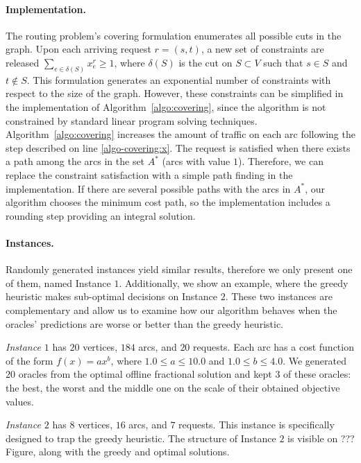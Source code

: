 \paragraph{Implementation.}
The routing problem's covering formulation enumerates all possible cuts in the graph. Upon each arriving request $r = (s,t)$, a new set of constraints are released $\sum_{e \in \delta(S)} x_{e}^{r} \ge 1$, where $\delta(S)$ is the cut on $S \subset V$ such that $s \in S$ and $t \notin S$. This formulation generates an exponential number of constraints with respect to the size of the graph. However, these constraints can be simplified in the implementation of Algorithm~\ref{algo:covering}, since the algorithm is not constrained by standard linear program solving techniques. Algorithm~\ref{algo:covering} increases the amount of traffic on each arc following the step described on line \ref{algo-covering:x}. The request is satisfied when there exists a path among the arcs in the set $A^{*}$ (arcs with value $1$). Therefore, we can replace the constraint satisfaction with a simple path finding in the implementation. If there are several possible paths with the arcs in $A^{*}$, our algorithm chooses the minimum cost path, so the implementation includes a rounding step providing an integral solution.


\paragraph{Instances.} Randomly generated instances yield similar results, therefore we only present one of them, named Instance $1$. Additionally, we show an example, where the greedy heuristic makes sub-optimal decisions on Instance $2$. These two instances are complementary and allow us to examine how our algorithm behaves when the oracles' predictions are worse or better than the greedy heuristic.

\textit{Instance $1$} has $20$ vertices, $184$ arcs, and $20$ requests. Each arc has a cost function of the form $f(x) = a x^b$, where $1.0 \le a \le 10.0$ and $1.0 \le b \le 4.0$. We generated $20$ oracles from the optimal offline fractional solution and kept $3$ of these oracles: the best, the worst and the middle one on the scale of their obtained objective values.

\textit{Instance $2$} has $8$ vertices, $16$ arcs, and $7$ requests. This instance is specifically designed to trap the greedy heuristic. The structure of Instance $2$ is visible on ??? Figure, along with the greedy and optimal solutions.

